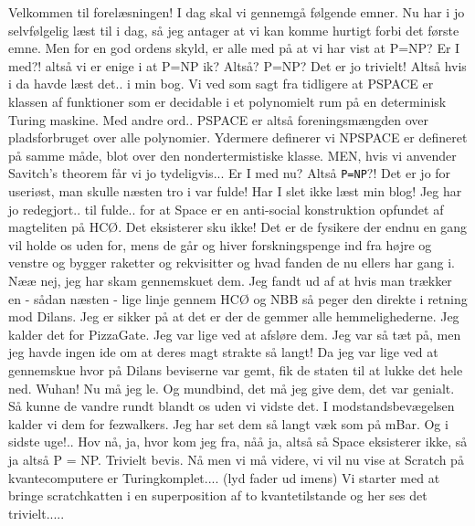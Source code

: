 \documentclass[a4paper,11pt]{article}
\begin{document}
\begin{sketch}
 Velkommen til forelæsningen! I dag skal vi gennemgå følgende emner.
 Nu har i jo selvfølgelig læst til i dag, så jeg antager at vi kan komme hurtigt forbi det første emne. Men for en god ordens skyld, er alle med på at vi har vist at P=NP?
 Er I med?! altså vi er enige i at P=NP ik?
 Altså? P=NP? Det er jo trivielt! Altså hvis i da havde læst det.. i min bog.
Vi ved som sagt fra tidligere at PSPACE er klassen af funktioner som er decidable i et polynomielt rum på en determinisk Turing maskine. Med andre ord..
 PSPACE er altså foreningsmængden over pladsforbruget over alle polynomier.
 Ydermere definerer vi NPSPACE er defineret på samme måde, blot over den nondertermistiske klasse.
 MEN, hvis vi anvender Savitch’s theorem får vi jo tydeligvis...
 Er I med nu? Altså \texttt{P\textvisiblespace=NP\textvisiblespace}?!
 Det er jo for useriøst, man skulle næsten tro i var fulde!
 Har I slet ikke læst min blog! Jeg har jo redegjort.. til fulde.. for at Space er en anti-social konstruktion opfundet af magteliten på HCØ.
 Det eksisterer sku ikke! Det er de fysikere der endnu en gang vil holde os uden for, mens de går og hiver forskningspenge ind fra højre og venstre og bygger raketter og rekvisitter og hvad fanden de nu ellers har gang i.
 Nææ nej, jeg har skam gennemskuet dem. Jeg fandt ud af at hvis man trækker en - sådan næsten - lige linje gennem HCØ og NBB så peger den direkte i retning mod Dilans.
 Jeg er sikker på at det er der de gemmer alle hemmelighederne. Jeg kalder det for PizzaGate.
 Jeg var lige ved at afsløre dem. Jeg var så tæt på, men jeg havde ingen ide om at deres magt strakte så langt! Da jeg var lige ved at gennemskue hvor på Dilans beviserne var gemt, fik de staten til at lukke det hele ned.
 Wuhan! Nu må jeg le. Og mundbind, det må jeg give dem, det var genialt. Så kunne de vandre rundt blandt os uden vi vidste det. I modstandsbevægelsen kalder vi dem for fezwalkers. Jeg har set dem så langt væk som på mBar. Og i sidste uge!.. 
 Hov nå, ja, hvor kom jeg fra, nåå ja, altså så Space eksisterer ikke, så ja altså P = NP. Trivielt bevis.
 Nå men vi må videre, vi vil nu vise at Scratch på kvantecomputere er Turingkomplet....
 (lyd fader ud imens) Vi starter med at bringe scratchkatten i en superposition af to kvantetilstande og her ses det trivielt.....
\end{sketch}
\end{document}
